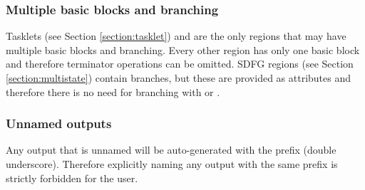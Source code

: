 \subsubsection{Multiple basic blocks and branching}
Tasklets (see Section \ref{section:tasklet}) and  are the only regions that may have multiple basic blocks and branching. Every other region has only one basic block and therefore terminator operations can be omitted. SDFG regions (see Section \ref{section:multistate}) contain branches, but these are provided as attributes and therefore there is no need for branching with  or .

\subsubsection{Unnamed outputs}
Any output that is unnamed will be auto-generated with the prefix \codeword{__} (double underscore). Therefore explicitly naming any output with the same prefix is strictly forbidden for the user.
